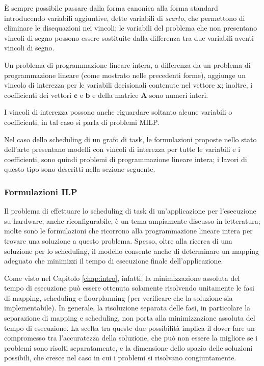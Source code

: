 È sempre possibile passare dalla forma canonica alla forma standard 
introducendo variabili aggiuntive, dette variabili di \emph{scarto}, che 
permettono di eliminare le disequazioni nei vincoli; le variabili del problema 
che non presentano vincoli di segno possono essere sostituite dalla differenza 
tra due variabili aventi vincoli di segno.

Un problema di programmazione lineare intera, a differenza da un problema di 
programmazione lineare (come mostrato nelle precedenti forme), aggiunge un 
vincolo di interezza per le variabili decisionali contenute nel vettore 
$\mathbf{x}$; inoltre, i coefficienti dei vettori $\mathbf{c}$ e $\mathbf{b}$ 
e della matrice $\mathbf{A}$ sono numeri interi.

I vincoli di interezza possono anche riguardare soltanto alcune variabili o 
coefficienti, in tal caso si parla di problemi \ac{MILP}.

Nel caso dello scheduling di un grafo di task, le formulazioni proposte nello 
stato dell'arte presentano modelli con vincoli di interezza per tutte le 
variabili e i coefficienti, sono quindi problemi di programmazione lineare 
intera; i lavori di questo tipo sono descritti nella sezione seguente.


\subsubsection{Formulazioni \acs{ILP}}
Il problema di effettuare lo scheduling di task di un'applicazione per 
l'esecuzione su hardware, anche riconfigurabile, è un tema ampiamente discusso 
in letteratura; molte sono le formulazioni che ricorrono alla programmazione 
lineare intera per trovare una soluzione a questo problema. Spesso, oltre alla 
ricerca di una soluzione per lo scheduling, il modello consente anche di 
determinare un mapping adeguato che minimizzi il tempo di esecuzione finale
dell'applicazione.

Come visto nel Capitolo \ref{chap:intro}, infatti, la minimizzazione assoluta 
del tempo di esecuzione può essere ottenuta solamente risolvendo unitamente le 
fasi di mapping, scheduling e floorplanning (per verificare che la soluzione 
sia implementabile). In generale, la risoluzione separata delle fasi, in 
particolare la separazione di mapping e scheduling, non porta alla 
minimizzazione assoluta del tempo di esecuzione. La scelta tra queste due 
possibilità implica il dover fare un compromesso tra l'accuratezza della 
soluzione, che può non essere la migliore se i problemi sono risolti 
separatamente, e la dimensione dello spazio delle soluzioni possibili, che 
cresce nel caso in cui i problemi si risolvano congiuntamente.

